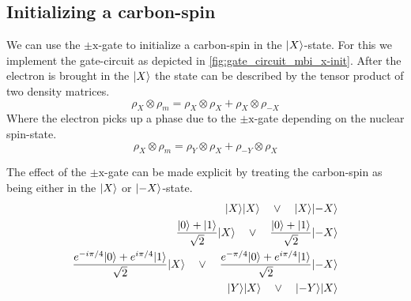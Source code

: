 \subsection{Initializing a carbon-spin}
We can use the $\pm\mathrm{x}$-gate to initialize a carbon-spin in the $ {\left\vert{X}\right\rangle}$-state.
For this we implement the gate-circuit as depicted in \cref{fig:gate_circuit_mbi_x-init}.
After the electron is brought in the ${\left\vert{X}\right\rangle}$ the state can be described by the tensor product of two density matrices.
\begin{equation}
    \rho_X \otimes \rho_m = \rho_X \otimes \rho_{X} +\rho_X \otimes \rho_{-X}
\end{equation}
Where the electron picks up a phase due to the $\pm{\mathrm{x}}$-gate depending on the nuclear spin-state.
\begin{equation}
    \rho_X \otimes \rho_m = \rho_Y \otimes \rho_{X} +\rho_{-Y} \otimes \rho_{X}
    \label{eq:density_after_Ren}
\end{equation}

The effect of the $\pm{\mathrm{x}}$-gate can be made explicit by treating the carbon-spin as being either in the ${\left\vert{X}\right\rangle}$ or ${\left\vert{-X}\right\rangle}$-state.
\begin{align}
    {\left\vert{X}\right\rangle}{\left\vert{X}\right\rangle} \quad \vee  \quad{\left\vert{X}\right\rangle}{\left\vert{-X}\right\rangle}\\
    \frac{{\left\vert{0}\right\rangle}+{\left\vert{1}\right\rangle}}{\sqrt{2}}{\left\vert{X}\right\rangle} \quad \vee \quad \frac{{\left\vert{0}\right\rangle}+{\left\vert{1}\right\rangle}}{\sqrt{2}}{\left\vert{-X}\right\rangle} \\
    \frac{e^{-i\pi/4}{\left\vert{0}\right\rangle}+e^{i\pi/4}{\left\vert{1}\right\rangle}}{\sqrt{2}}{\left\vert{X}\right\rangle} \quad \vee \quad \frac{e^{-\pi/4}{\left\vert{0}\right\rangle}+e^{i\pi/4}{\left\vert{1}\right\rangle}}{\sqrt{2}}{\left\vert{-X}\right\rangle}\\
    {\left\vert{Y}\right\rangle}{\left\vert{X}\right\rangle} \quad \vee \quad {\left\vert{-Y}\right\rangle}{\left\vert{X}\right\rangle}
\end{align}

